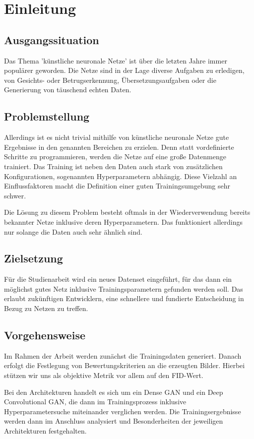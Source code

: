 
\chapter{Einleitung}
\section{Ausgangssituation}
Das Thema 'künstliche neuronale Netze' ist über die letzten Jahre immer populärer geworden.
Die Netze sind in der Lage diverse Aufgaben zu erledigen, von Gesichts- oder Betrugserkennung, Übersetzungsaufgaben oder die Generierung von täuschend echten Daten.

\section{Problemstellung}
Allerdings ist es nicht trivial mithilfe von künstliche neuronale Netze gute Ergebnisse in den genannten Bereichen zu erzielen.
Denn statt vordefinierte Schritte zu programmieren, werden die Netze auf eine große Datenmenge trainiert.
Das Training ist neben den Daten auch stark von zusätzlichen Konfigurationen, sogenannten Hyperparametern abhängig.
Diese Vielzahl an Einflussfaktoren macht die Definition einer guten Trainingsumgebung sehr schwer.
\newline

Die Lösung zu diesem Problem besteht oftmals in der Wiederverwendung bereits bekannter Netze inklusive deren Hyperparametern.
Das funktioniert allerdings nur solange die Daten auch sehr ähnlich sind.


\section{Zielsetzung}
Für die Studienarbeit wird ein neues Datenset eingeführt, für das dann ein möglichst gutes Netz inklusive Trainingsparametern gefunden werden soll.
Das erlaubt zukünftigen Entwicklern, eine schnellere und fundierte Entscheidung in Bezug zu Netzen  zu treffen.

\section{Vorgehensweise}
Im Rahmen der Arbeit werden zunächst die Trainingsdaten generiert.
Danach erfolgt die Festlegung von Bewertungskriterien an die erzeugten Bilder.
Hierbei stützen wir uns als objektive Metrik vor allem auf den FID-Wert.

Bei den Architekturen handelt es sich um ein Dense GAN und ein Deep Convolutional GAN, die dann im Trainingsprozess inklusive Hyperparametersuche miteinander verglichen werden.
Die Trainingsergebnisse werden dann im Anschluss analysiert und Besonderheiten der jeweiligen Architekturen festgehalten.
